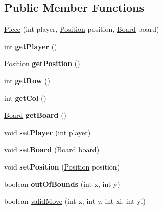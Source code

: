 \subsection*{Public Member Functions}
\begin{DoxyCompactItemize}
\item 
\hyperlink{classmain_1_1_piece_a02a26b5661817cccd3f07d63349144f8}{Piece} (int player, \hyperlink{classmain_1_1_position}{Position} position, \hyperlink{classmain_1_1_board}{Board} board)
\item 
\mbox{\label{classmain_1_1_piece_aa5b9e15c472cd58753a5b7db76666ed0}} 
int {\bfseries get\+Player} ()
\item 
\mbox{\label{classmain_1_1_piece_a609b995790e8ce5ac6150d43765f33e6}} 
\hyperlink{classmain_1_1_position}{Position} {\bfseries get\+Position} ()
\item 
\mbox{\label{classmain_1_1_piece_ac64b94e395aeccaa7775f64347008942}} 
int {\bfseries get\+Row} ()
\item 
\mbox{\label{classmain_1_1_piece_a8bd82e7f1f966d64d6ae71ea6a1b2866}} 
int {\bfseries get\+Col} ()
\item 
\mbox{\label{classmain_1_1_piece_a4379392982c94b448a00c4a83f3d5552}} 
\hyperlink{classmain_1_1_board}{Board} {\bfseries get\+Board} ()
\item 
\mbox{\label{classmain_1_1_piece_af64fbce8fc1e520849595a2e902f0db3}} 
void {\bfseries set\+Player} (int player)
\item 
\mbox{\label{classmain_1_1_piece_a1b2f7b9dc5c716c353937849d26d2def}} 
void {\bfseries set\+Board} (\hyperlink{classmain_1_1_board}{Board} board)
\item 
\mbox{\label{classmain_1_1_piece_a25386672406846164d702a0dedb29eaf}} 
void {\bfseries set\+Position} (\hyperlink{classmain_1_1_position}{Position} position)
\item 
\mbox{\label{classmain_1_1_piece_ae3d8f5049a959c98cc3e1c11fe071603}} 
boolean {\bfseries out\+Of\+Bounds} (int x, int y)
\item 
boolean \hyperlink{classmain_1_1_piece_a9155e5be2c034abe7c87aa6c2410cdfb}{valid\+Move} (int x, int y, int xi, int yi)
\end{DoxyCompactItemize}


